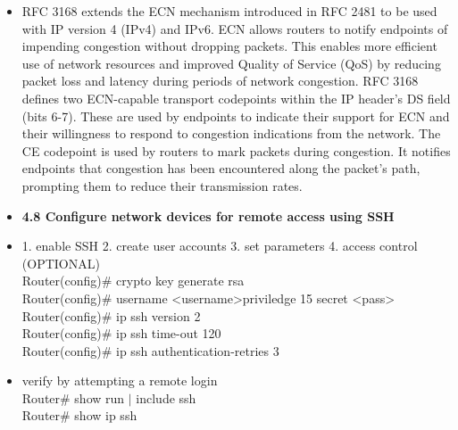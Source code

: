\documentclass{article}
\begin{document}
\begin{itemize}
	\item[] RFC 3168 extends the ECN mechanism introduced in RFC 2481 to be used with IP version 4 (IPv4) and IPv6. ECN allows routers to notify endpoints of impending congestion without dropping packets. This enables more efficient use of network resources and improved Quality of Service (QoS) by reducing packet loss and latency during periods of network congestion. RFC 3168 defines two ECN-capable transport codepoints within the IP header's DS field (bits 6-7). These are used by endpoints to indicate their support for ECN and their willingness to respond to congestion indications from the network. The CE codepoint is used by routers to mark packets during congestion. It notifies endpoints that congestion has been encountered along the packet's path, prompting them to reduce their transmission rates.
  
  \item \textbf{4.8 Configure network devices for remote access using SSH}
  	\item[] 1. enable SSH 2. create user accounts 3. set parameters 4. access control (OPTIONAL)\\
		Router(config)\# crypto key generate rsa\\
		Router(config)\# username \textless username\textgreater priviledge 15 secret \textless pass\textgreater\\
		Router(config)\# ip ssh version 2\\
		Router(config)\# ip ssh time-out 120\\
		Router(config)\# ip ssh authentication-retries 3
	\item[] verify by attempting a remote login\\
		Router\# show run $\mid$ include ssh\\
		Router\# show ip ssh
  

\end{itemize}
\end{document}

